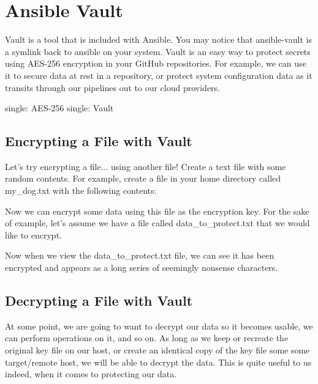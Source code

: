 \section{Ansible Vault}

\justify
Vault is a tool that is included with Ansible. You may notice that
ansible-vault is a symlink back to ansible on your system. Vault is an
easy way to protect secrets using AES-256 encryption in your GitHub
repositories. For example, we can use it to secure data at rest in a
repository, or protect system configuration data as it transits through
our pipelines out to our cloud providers.

single: AES-256 single: Vault

\subsection{Encrypting a File with Vault}

\justify
Let's try encrypting a file... using another file! Create a text file
with some random contents. For example, create a file in your home
directory called my\_dog.txt with the following contents:

\begin{Shaded}
   \begin{Highlighting}[]
   \end{Highlighting}
\end{Shaded}

Now we can encrypt some data using this file as the encryption key. For
the sake of example, let's assume we have a file called
data\_to\_protect.txt that we would like to encrypt.

\begin{Shaded}
   \begin{Highlighting}[]
   \end{Highlighting}
\end{Shaded}

Now when we view the data\_to\_protect.txt file, we can see it has been
encrypted and appears as a long series of seemingly nonsense characters.


\subsection{Decrypting a File with Vault}

\justify
At some point, we are going to want to decrypt our data so it becomes
usable, we can perform operations on it, and so on. As long as we keep
or recreate the original key file on our host, or create an identical
copy of the key file some some target/remote host, we will be able to
decrypt the data. This is quite useful to us indeed, when it comes to
protecting our data.

